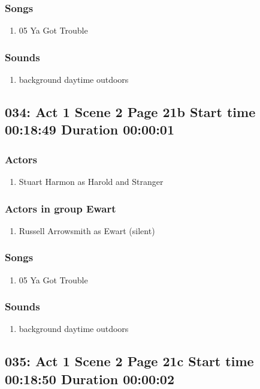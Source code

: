 \subsubsection{Songs}
\begin{enumerate}
\item 05 Ya Got Trouble
\end{enumerate}\subsubsection{Sounds}
\begin{enumerate}
\item background daytime outdoors
\end{enumerate}
\subsection{034: Act 1 Scene 2 Page 21b Start time 00:18:49 Duration 00:00:01}

\subsubsection{Actors}
\begin{enumerate}
\item Stuart Harmon as Harold and Stranger
\end{enumerate}
\subsubsection{Actors in group Ewart}
\begin{enumerate}
\item Russell Arrowsmith as Ewart (silent)
\end{enumerate}

\subsubsection{Songs}
\begin{enumerate}
\item 05 Ya Got Trouble
\end{enumerate}\subsubsection{Sounds}
\begin{enumerate}
\item background daytime outdoors
\end{enumerate}
\subsection{035: Act 1 Scene 2 Page 21c Start time 00:18:50 Duration 00:00:02}

